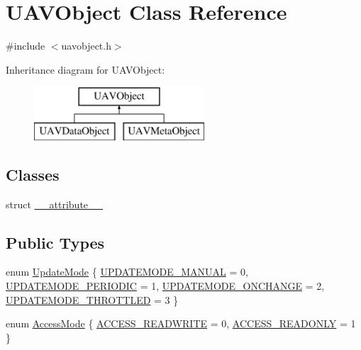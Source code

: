 \hypertarget{class_u_a_v_object}{\section{\-U\-A\-V\-Object \-Class \-Reference}
\label{class_u_a_v_object}
}


{\ttfamily \#include $<$uavobject.\-h$>$}

\-Inheritance diagram for \-U\-A\-V\-Object\-:\begin{figure}[H]
\begin{center}
\leavevmode
\includegraphics[height=2.000000cm]{class_u_a_v_object}
\end{center}
\end{figure}
\subsection*{\-Classes}
\begin{DoxyCompactItemize}
\item 
struct \hyperlink{struct_u_a_v_object_1_1____attribute____}{\-\_\-\-\_\-attribute\-\_\-\-\_\-}
\end{DoxyCompactItemize}
\subsection*{\-Public \-Types}
\begin{DoxyCompactItemize}
\item 
enum \hyperlink{group___u_a_v_objects_plugin_ga08c0580992fcd51c2b44734e2d24cac6}{\-Update\-Mode} \{ \hyperlink{group___u_a_v_objects_plugin_gga08c0580992fcd51c2b44734e2d24cac6a7e761571cc6ee4432fa664f23fcb7032}{\-U\-P\-D\-A\-T\-E\-M\-O\-D\-E\-\_\-\-M\-A\-N\-U\-A\-L} =  0, 
\hyperlink{group___u_a_v_objects_plugin_gga08c0580992fcd51c2b44734e2d24cac6a6057e8a8af67f00940fad6f62499b843}{\-U\-P\-D\-A\-T\-E\-M\-O\-D\-E\-\_\-\-P\-E\-R\-I\-O\-D\-I\-C} =  1, 
\hyperlink{group___u_a_v_objects_plugin_gga08c0580992fcd51c2b44734e2d24cac6a118268aa016a1f371149d6180bd9a366}{\-U\-P\-D\-A\-T\-E\-M\-O\-D\-E\-\_\-\-O\-N\-C\-H\-A\-N\-G\-E} =  2, 
\hyperlink{group___u_a_v_objects_plugin_gga08c0580992fcd51c2b44734e2d24cac6aea4380a186f544bd364259d2e436fb75}{\-U\-P\-D\-A\-T\-E\-M\-O\-D\-E\-\_\-\-T\-H\-R\-O\-T\-T\-L\-E\-D} =  3
 \}
\item 
enum \hyperlink{group___u_a_v_objects_plugin_ga80357a2f38fa4be23200de86614c3d77}{\-Access\-Mode} \{ \hyperlink{group___u_a_v_objects_plugin_gga80357a2f38fa4be23200de86614c3d77ad710c074e7e275da805bf900c9917d47}{\-A\-C\-C\-E\-S\-S\-\_\-\-R\-E\-A\-D\-W\-R\-I\-T\-E} =  0, 
\hyperlink{group___u_a_v_objects_plugin_gga80357a2f38fa4be23200de86614c3d77a97e59f527995175cc60e103001470e49}{\-A\-C\-C\-E\-S\-S\-\_\-\-R\-E\-A\-D\-O\-N\-L\-Y} =  1
 \}
\end{DoxyCompactItemize}
